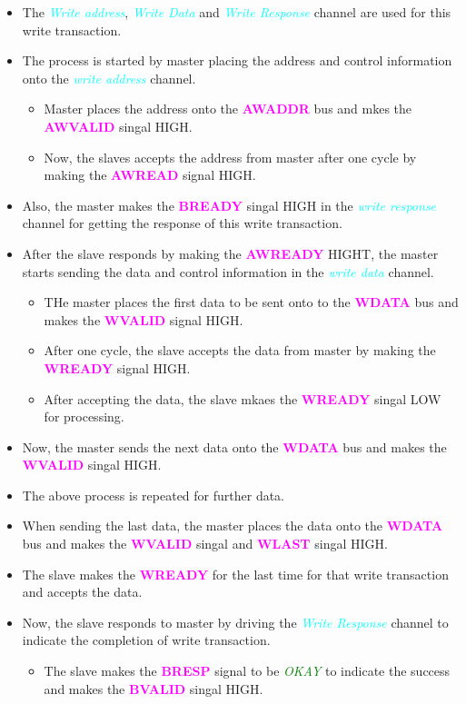 \documentclass{article}
\newcommand{\chFormat}[1]{\emph{\textcolor{cyan}{#1}}}
\newcommand{\AXISignals}[1]{\textbf{\textcolor{magenta}{#1}}}
\begin{document}
\begin{itemize}
    \item The \chFormat{Write address}, \chFormat{Write Data} and \chFormat{Write Response} channel are used for this write transaction.
    \item The process is started by master placing the address and control information onto the \chFormat{write address} channel.
    \begin{itemize}
        \item Master places the address onto the \AXISignals{AWADDR} bus and mkes the \AXISignals{AWVALID} singal HIGH.
        \item Now, the slaves accepts the address from master after one cycle by making the \AXISignals{AWREAD} signal HIGH.
    \end{itemize}
    \item Also, the master makes the \AXISignals{BREADY} singal HIGH in the \chFormat{write response} channel for getting the response of this write transaction.
    \item After the slave responds by making the \AXISignals{AWREADY} HIGHT, the master starts sending the data and control information in the \chFormat{write data} channel.
    \begin{itemize}
        \item THe master places the first data to be sent onto to the \AXISignals{WDATA} bus and makes the \AXISignals{WVALID} signal HIGH.
        \item After one cycle, the slave accepts the data from master by making the \AXISignals{WREADY} signal HIGH.
        \item After accepting the data, the slave mkaes the \AXISignals{WREADY} singal LOW for processing.        
    \end{itemize} 
    \item Now, the master sends the next data onto the \AXISignals{WDATA} bus and makes the \AXISignals{WVALID} singal HIGH.
    \item The above process is repeated for further data.
    \item When sending the last data, the master places the data onto the \AXISignals{WDATA} bus and makes the \AXISignals{WVALID} singal and \AXISignals{WLAST} singal HIGH.
    \item The slave makes the \AXISignals{WREADY} for the last time for that write transaction and accepts the data.
    \item Now, the slave responds to master by driving the \chFormat{Write Response} channel to indicate the completion of write transaction.
    \begin{itemize}
        \item The slave makes the \AXISignals{BRESP} signal to be \emph{\textcolor{green}{OKAY}} to indicate the success and makes the \AXISignals{BVALID} singal HIGH.
    \end{itemize}
\end{itemize}
\end{document}
